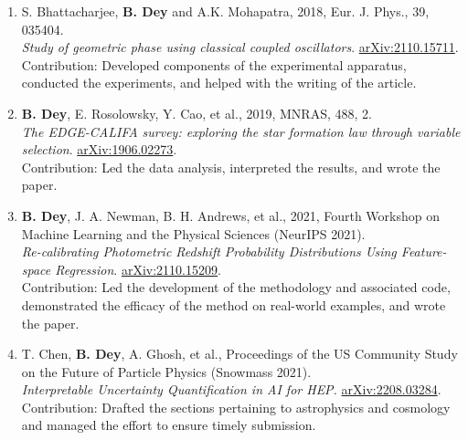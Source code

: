  \begin{enumerate}
    \item S. Bhattacharjee, \textbf{B. Dey} and A.K. Mohapatra, 2018, Eur. J. Phys., 39, 035404.\\ \textrm{\textit{Study of geometric phase using classical coupled oscillators}}. \href{https://arxiv.org/abs/2110.15711}{arXiv:2110.15711}.
    \\ Contribution: Developed components of the experimental apparatus, conducted the experiments, and helped with the writing of the article.
    
     \item \textbf{B. Dey}, E. Rosolowsky, Y. Cao, et al., 2019, MNRAS, 488, 2.\\ \textrm{\textit{The EDGE-CALIFA survey: exploring the star formation law through variable selection}}. \href{https://arxiv.org/abs/1906.02273}{arXiv:1906.02273}.
     \\ Contribution: Led the data analysis, interpreted the results, and wrote the paper. 
     
      \item \textbf{B. Dey}, J. A. Newman, B. H. Andrews, et al., 2021, Fourth Workshop on Machine Learning and the Physical Sciences (NeurIPS 2021).\\ \textrm{\textit{Re-calibrating Photometric Redshift Probability Distributions Using Feature-space Regression}}. \href{https://arxiv.org/abs/2110.15209}{arXiv:2110.15209}.
         \\ Contribution: Led the development of the methodology and associated code, demonstrated the efficacy of the method on real-world examples, and wrote the paper.

         
       \item T. Chen, \textbf{B. Dey}, A. Ghosh, et al., Proceedings of the US Community Study on the Future of Particle Physics (Snowmass 2021).\\ \textrm{\textit{Interpretable Uncertainty Quantification in AI for HEP.}} \href{https://arxiv.org/abs/2208.03284}{arXiv:2208.03284}.
         \\ Contribution: Drafted the sections pertaining to astrophysics and cosmology and managed the effort to ensure timely submission. 


\end{enumerate}

